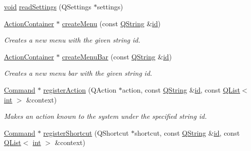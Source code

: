 \begin{DoxyCompactItemize}
\item 
\hyperlink{group___u_a_v_objects_plugin_ga444cf2ff3f0ecbe028adce838d373f5c}{void} \hyperlink{group___core_plugin_ga097c433a1e3ae316de47ded726e0f639}{read\-Settings} (Q\-Settings $\ast$settings)
\item 
\hyperlink{class_core_1_1_action_container}{Action\-Container} $\ast$ \hyperlink{group___core_plugin_ga1a2a9935fbe66257754f6cf21e596c01}{create\-Menu} (const \hyperlink{group___u_a_v_objects_plugin_gab9d252f49c333c94a72f97ce3105a32d}{Q\-String} \&\hyperlink{glext_8h_a58c2a664503e14ffb8f21012aabff3e9}{id})
\begin{DoxyCompactList}\small\item\em Creates a new menu with the given string {\itshape id}. \end{DoxyCompactList}\item 
\hyperlink{class_core_1_1_action_container}{Action\-Container} $\ast$ \hyperlink{group___core_plugin_gaef1eb51454ecf1c2d3989db8b3a4e127}{create\-Menu\-Bar} (const \hyperlink{group___u_a_v_objects_plugin_gab9d252f49c333c94a72f97ce3105a32d}{Q\-String} \&\hyperlink{glext_8h_a58c2a664503e14ffb8f21012aabff3e9}{id})
\begin{DoxyCompactList}\small\item\em Creates a new menu bar with the given string {\itshape id}. \end{DoxyCompactList}\item 
\hyperlink{class_core_1_1_command}{Command} $\ast$ \hyperlink{group___core_plugin_ga85856b30617fb3861bb25b1745e88ab1}{register\-Action} (Q\-Action $\ast$action, const \hyperlink{group___u_a_v_objects_plugin_gab9d252f49c333c94a72f97ce3105a32d}{Q\-String} \&\hyperlink{glext_8h_a58c2a664503e14ffb8f21012aabff3e9}{id}, const \hyperlink{class_q_list}{Q\-List}$<$ \hyperlink{ioapi_8h_a787fa3cf048117ba7123753c1e74fcd6}{int} $>$ \&context)
\begin{DoxyCompactList}\small\item\em Makes an {\itshape action} known to the system under the specified string {\itshape id}. \end{DoxyCompactList}\item 
\hyperlink{class_core_1_1_command}{Command} $\ast$ \hyperlink{group___core_plugin_ga887455dd80ccba90125634d83982950d}{register\-Shortcut} (Q\-Shortcut $\ast$shortcut, const \hyperlink{group___u_a_v_objects_plugin_gab9d252f49c333c94a72f97ce3105a32d}{Q\-String} \&\hyperlink{glext_8h_a58c2a664503e14ffb8f21012aabff3e9}{id}, const \hyperlink{class_q_list}{Q\-List}$<$ \hyperlink{ioapi_8h_a787fa3cf048117ba7123753c1e74fcd6}{int} $>$ \&context)

\end{DoxyCompactItemize}
